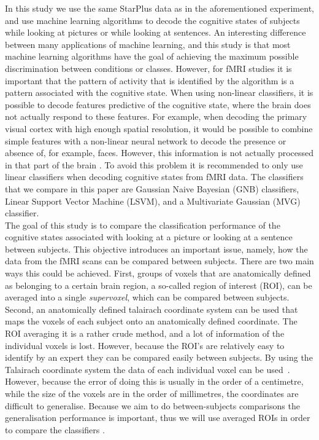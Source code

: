 \documentclass[preprint,journal,11pt]{vgtc}
\begin{document}
In this study we use the same StarPlus data as in the aforementioned experiment, and use machine learning algorithms to decode the cognitive states of subjects while looking at pictures or while looking at sentences. An interesting difference between many applications of machine learning, and this study is that most machine learning algorithms have the goal of achieving the maximum possible discrimination between conditions or classes. However, for fMRI studies it is important that the pattern of activity that is identified by the algorithm is a pattern associated with the cognitive state. When using non-linear classifiers, it is possible to decode features predictive of the cognitive state, where the brain does not actually respond to these features. For example, when decoding the primary visual cortex with high enough spatial resolution, it would be possible to combine simple features with a non-linear neural network to decode the presence or absence of, for example, faces. However, this information is not actually processed in that part of the brain \cite{to:2012rev}. To avoid this problem it is recommended to only use linear classifiers when decoding cognitive states from fMRI data. The classifiers that we compare in this paper are Gaussian Naive Bayesian (GNB) classifiers, Linear Support Vector Machine (LSVM), and a Multivariate Gaussian (MVG) classifier.\\
\indent The goal of this study is to compare the classification performance of the cognitive states associated with looking at a picture or looking at a sentence between subjects. This objective introduces an important issue, namely, how the data from the fMRI scans can be compared between subjects. There are two main ways this could be achieved. First, groups of voxels that are anatomically defined as belonging to a certain brain region, a so-called region of interest (ROI), can be averaged into a single \emph{supervoxel}, which can be compared between subjects. Second, an anatomically defined talairach coordinate system can be used that maps the voxels of each subject onto an anatomically defined coordinate. The ROI averaging it is a rather crude method, and a lot of information of the individual voxels is lost. However, because the ROI's are relatively easy to identify by an expert they can be compared easily between subjects. By using the Talairach coordinate system the data of each individual voxel can be used~\cite{talairach1988co}. However, because the error of doing this is usually in the order of a centimetre, while the size of the voxels are in the order of millimetres, the coordinates are difficult to generalise. Because we aim to do between-subjects comparisons the generalisation performance is important, thus we will use averaged ROIs in order to compare the classifiers \cite{mi:2004coord}.
\end{document}
